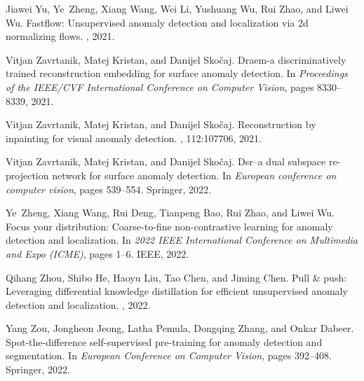 \documentclass[5p, twocolumn]{elsarticle}[draft]
\begin{document}
\begin{thebibliography}{10}
Jiawei Yu, Ye~Zheng, Xiang Wang, Wei Li, Yushuang Wu, Rui Zhao, and Liwei Wu.
\newblock Fastflow: Unsupervised anomaly detection and localization via 2d normalizing flows.
, 2021.

Vitjan Zavrtanik, Matej Kristan, and Danijel Sko{\v{c}}aj.
\newblock Draem-a discriminatively trained reconstruction embedding for surface anomaly detection.
\newblock In {\em Proceedings of the IEEE/CVF International Conference on Computer Vision}, pages 8330--8339, 2021.

Vitjan Zavrtanik, Matej Kristan, and Danijel Sko{\v{c}}aj.
\newblock Reconstruction by inpainting for visual anomaly detection.
, 112:107706, 2021.

Vitjan Zavrtanik, Matej Kristan, and Danijel Sko{\v{c}}aj.
\newblock Dsr--a dual subspace re-projection network for surface anomaly detection.
\newblock In {\em European conference on computer vision}, pages 539--554. Springer, 2022.

Ye~Zheng, Xiang Wang, Rui Deng, Tianpeng Bao, Rui Zhao, and Liwei Wu.
\newblock Focus your distribution: Coarse-to-fine non-contrastive learning for anomaly detection and localization.
\newblock In {\em 2022 IEEE International Conference on Multimedia and Expo (ICME)}, pages 1--6. IEEE, 2022.

Qihang Zhou, Shibo He, Haoyu Liu, Tao Chen, and Jiming Chen.
\newblock Pull \& push: Leveraging differential knowledge distillation for efficient unsupervised anomaly detection and localization.
, 2022.

Yang Zou, Jongheon Jeong, Latha Pemula, Dongqing Zhang, and Onkar Dabeer.
\newblock Spot-the-difference self-supervised pre-training for anomaly detection and segmentation.
\newblock In {\em European Conference on Computer Vision}, pages 392--408. Springer, 2022.

\end{thebibliography}
\end{document}

